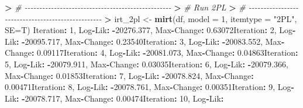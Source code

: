 \documentclass[
]{article}
\newenvironment{Shaded}{\begin{snugshade}}{\end{snugshade}}
\newcommand{\AttributeTok}[1]{\textcolor[rgb]{0.13,0.29,0.53}{#1}}
\newcommand{\CommentTok}[1]{\textcolor[rgb]{0.56,0.35,0.01}{\textit{#1}}}
\newcommand{\DecValTok}[1]{\textcolor[rgb]{0.00,0.00,0.81}{#1}}
\newcommand{\ErrorTok}[1]{\textcolor[rgb]{0.64,0.00,0.00}{\textbf{#1}}}
\newcommand{\FloatTok}[1]{\textcolor[rgb]{0.00,0.00,0.81}{#1}}
\newcommand{\FunctionTok}[1]{\textcolor[rgb]{0.13,0.29,0.53}{\textbf{#1}}}
\newcommand{\NormalTok}[1]{#1}
\newcommand{\OtherTok}[1]{\textcolor[rgb]{0.56,0.35,0.01}{#1}}
\newcommand{\SpecialCharTok}[1]{\textcolor[rgb]{0.81,0.36,0.00}{\textbf{#1}}}
\newcommand{\StringTok}[1]{\textcolor[rgb]{0.31,0.60,0.02}{#1}}
\begin{document}
\begin{Shaded}
\begin{Highlighting}[]
\SpecialCharTok{\textgreater{}} \CommentTok{\# {-}{-}{-}{-}{-}{-}{-}{-}{-}{-}{-}{-}{-}{-}{-}{-}{-}{-}{-}{-}{-}{-}{-}{-}{-}{-}{-}{-}{-}{-}{-}{-}{-}{-}{-}{-}{-}{-}{-}{-}{-}{-}{-}{-}{-}{-}{-}{-}{-}{-}}
\ErrorTok{\textgreater{}} \CommentTok{\#                       Run 2PL}
\ErrorTok{\textgreater{}} \CommentTok{\# {-}{-}{-}{-}{-}{-}{-}{-}{-}{-}{-}{-}{-}{-}{-}{-}{-}{-}{-}{-}{-}{-}{-}{-}{-}{-}{-}{-}{-}{-}{-}{-}{-}{-}{-}{-}{-}{-}{-}{-}{-}{-}{-}{-}{-}{-}{-}{-}{-}{-}}
\ErrorTok{\textgreater{}}\NormalTok{ irt\_2pl }\OtherTok{\textless{}{-}} \FunctionTok{mirt}\NormalTok{(df, }\AttributeTok{model =} \DecValTok{1}\NormalTok{, }\AttributeTok{itemtype =} \StringTok{"2PL"}\NormalTok{, }\AttributeTok{SE=}\NormalTok{T)}
\NormalTok{Iteration}\SpecialCharTok{:} \DecValTok{1}\NormalTok{, Log}\SpecialCharTok{{-}}\NormalTok{Lik}\SpecialCharTok{:} \SpecialCharTok{{-}}\FloatTok{20276.377}\NormalTok{, Max}\SpecialCharTok{{-}}\NormalTok{Change}\SpecialCharTok{:} \FloatTok{0.63072}\NormalTok{Iteration}\SpecialCharTok{:} \DecValTok{2}\NormalTok{, Log}\SpecialCharTok{{-}}\NormalTok{Lik}\SpecialCharTok{:} \SpecialCharTok{{-}}\FloatTok{20095.717}\NormalTok{, Max}\SpecialCharTok{{-}}\NormalTok{Change}\SpecialCharTok{:} \FloatTok{0.23540}\NormalTok{Iteration}\SpecialCharTok{:} \DecValTok{3}\NormalTok{, Log}\SpecialCharTok{{-}}\NormalTok{Lik}\SpecialCharTok{:} \SpecialCharTok{{-}}\FloatTok{20083.552}\NormalTok{, Max}\SpecialCharTok{{-}}\NormalTok{Change}\SpecialCharTok{:} \FloatTok{0.09117}\NormalTok{Iteration}\SpecialCharTok{:} \DecValTok{4}\NormalTok{, Log}\SpecialCharTok{{-}}\NormalTok{Lik}\SpecialCharTok{:} \SpecialCharTok{{-}}\FloatTok{20081.073}\NormalTok{, Max}\SpecialCharTok{{-}}\NormalTok{Change}\SpecialCharTok{:} \FloatTok{0.04863}\NormalTok{Iteration}\SpecialCharTok{:} \DecValTok{5}\NormalTok{, Log}\SpecialCharTok{{-}}\NormalTok{Lik}\SpecialCharTok{:} \SpecialCharTok{{-}}\FloatTok{20079.911}\NormalTok{, Max}\SpecialCharTok{{-}}\NormalTok{Change}\SpecialCharTok{:} \FloatTok{0.03035}\NormalTok{Iteration}\SpecialCharTok{:} \DecValTok{6}\NormalTok{, Log}\SpecialCharTok{{-}}\NormalTok{Lik}\SpecialCharTok{:} \SpecialCharTok{{-}}\FloatTok{20079.366}\NormalTok{, Max}\SpecialCharTok{{-}}\NormalTok{Change}\SpecialCharTok{:} \FloatTok{0.01853}\NormalTok{Iteration}\SpecialCharTok{:} \DecValTok{7}\NormalTok{, Log}\SpecialCharTok{{-}}\NormalTok{Lik}\SpecialCharTok{:} \SpecialCharTok{{-}}\FloatTok{20078.824}\NormalTok{, Max}\SpecialCharTok{{-}}\NormalTok{Change}\SpecialCharTok{:} \FloatTok{0.00471}\NormalTok{Iteration}\SpecialCharTok{:} \DecValTok{8}\NormalTok{, Log}\SpecialCharTok{{-}}\NormalTok{Lik}\SpecialCharTok{:} \SpecialCharTok{{-}}\FloatTok{20078.761}\NormalTok{, Max}\SpecialCharTok{{-}}\NormalTok{Change}\SpecialCharTok{:} \FloatTok{0.00351}\NormalTok{Iteration}\SpecialCharTok{:} \DecValTok{9}\NormalTok{, Log}\SpecialCharTok{{-}}\NormalTok{Lik}\SpecialCharTok{:} \SpecialCharTok{{-}}\FloatTok{20078.717}\NormalTok{, Max}\SpecialCharTok{{-}}\NormalTok{Change}\SpecialCharTok{:} \FloatTok{0.00474}\NormalTok{Iteration}\SpecialCharTok{:} \DecValTok{10}\NormalTok{, Log}\SpecialCharTok{{-}}\NormalTok{Lik}\SpecialCharTok{:} 
\end{Highlighting}
\end{Shaded}
\end{document}
